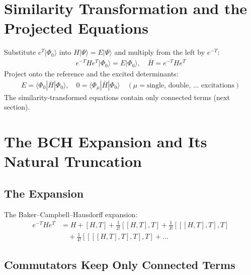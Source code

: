 \section{Similarity Transformation and the Projected Equations}

Substitute $e^{T}|\Phi_0\rangle$ into $H |\Psi\rangle = E |\Psi\rangle$ and multiply from the left by $e^{-T}$:
\begin{align*}
e^{-T} H e^T |\Phi_0\rangle = E |\Phi_0\rangle, \quad \bar{H} = e^{-T} H e^T
\end{align*}
Project onto the reference and the excited determinants:
\begin{align}\label{eq:cc-eqs}
E = \langle \Phi_0|\bar{H}|\Phi_0\rangle, \quad 0 = \langle \Phi_\mu|\bar{H}|\Phi_0\rangle \quad (\mu = \text{single, double, ... excitations})
\end{align}
The similarity-transformed equations contain only connected terms (next section).

\section{The BCH Expansion and Its Natural Truncation}

\subsection{The Expansion}

The Baker--Campbell--Hausdorff expansion:
\begin{align*}
e^{-T} H e^{T} &= H + [H, T] + \frac{1}{2!} [[H, T], T] + \frac{1}{3!} [[[H, T], T], T] \\
&\quad + \frac{1}{4!} [[[[H, T], T], T], T] + \dots
\end{align*}

\subsection{Commutators Keep Only Connected Terms}

